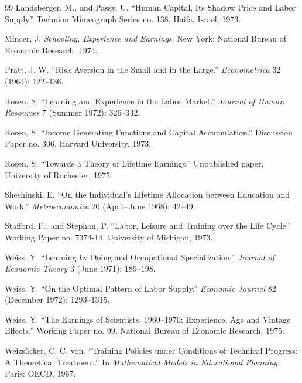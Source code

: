 \documentclass[11pt,fleqn]{article}
\begin{document}
\begin{thebibliography}{99}
Landsberger, M., and Passy, U. ``Human Capital, Its Shadow Price and Labor Supply.'' Technion Mimeograph Series no. 138, Haifa, Israel, 1973.

Mincer, J. \textit{Schooling, Experience and Earnings}. New York: National Bureau of Economic Research, 1974.

Pratt, J. W. ``Risk Aversion in the Small and in the Large.'' \textit{Econometrica} 32 (1964): 122--136.

Rosen, S. ``Learning and Experience in the Labor Market.'' \textit{Journal of Human Resources} 7 (Summer 1972): 326--342.

Rosen, S. ``Income Generating Functions and Capital Accumulation.'' Discussion Paper no. 306, Harvard University, 1973.

Rosen, S. ``Towards a Theory of Lifetime Earnings.'' Unpublished paper, University of Rochester, 1975.

Sheshinski, E. ``On the Individual's Lifetime Allocation between Education and Work.'' \textit{Metroeconomica} 20 (April--June 1968): 42--49.

Stafford, F., and Stephan, P. ``Labor, Leisure and Training over the Life Cycle.'' Working Paper no. 7374-14, University of Michigan, 1973.

Weiss, Y. ``Learning by Doing and Occupational Specialization.'' \textit{Journal of Economic Theory} 3 (June 1971): 189--198.

Weiss, Y. ``On the Optimal Pattern of Labor Supply.'' \textit{Economic Journal} 82 (December 1972): 1293--1315.

Weiss, Y. ``The Earnings of Scientists, 1960--1970: Experience, Age and Vintage Effects.'' Working Paper no. 99, National Bureau of Economic Research, 1975.

Weizsäcker, C. C. von. ``Training Policies under Conditions of Technical Progress: A Theoretical Treatment.'' In \textit{Mathematical Models in Educational Planning}. Paris: OECD, 1967.

\end{thebibliography}
\end{document}
